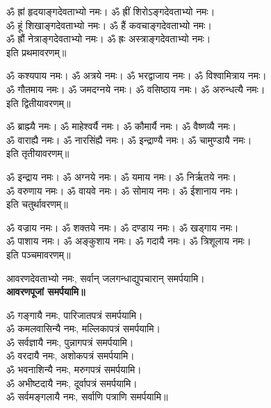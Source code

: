 
\begin{center}
ॐ ह्रां हृदयाङ्गदेवताभ्यो नमः। ॐ ह्रीं शिरोऽङ्गदेवताभ्यो नमः।\\
ॐ हूं शिखाङ्गदेवताभ्यो नमः। ॐ हैं कवचाङ्गदेवताभ्यो नमः।\\
ॐ ह्रौं नेत्राङ्गदेवताभ्यो नमः। ॐ ह्रः अस्त्राङ्गदेवताभ्यो नमः।\\
इति प्रथमावरणम्॥

ॐ कश्यपाय नमः। ॐ अत्रये नमः। ॐ भरद्वाजाय नमः। ॐ विश्वामित्राय नमः।\\
ॐ गौतमाय नमः। ॐ जमदग्नये नमः। ॐ वसिष्ठाय नमः। ॐ अरुन्धत्यै नमः।\\
इति द्वितीयावरणम्॥

ॐ ब्राह्म्यै नमः। ॐ माहेश्वर्यै नमः। ॐ कौमार्यै नमः। ॐ वैष्णव्यै नमः।\\
ॐ वाराह्यै नमः। ॐ नारसिंह्यै नमः। ॐ इन्द्राण्यै नमः। ॐ चामुण्डायै नमः।\\
इति तृतीयावरणम्॥

ॐ इन्द्राय नमः। ॐ अग्नये नमः। ॐ यमाय नमः। ॐ निर्ऋतये नमः।\\
ॐ वरुणाय नमः। ॐ वायवे नमः। ॐ सोमाय नमः। ॐ ईशानाय नमः।\\
इति चतुर्थावरणम्॥

ॐ वज्राय नमः। ॐ शक्तये नमः। ॐ दण्डाय नमः। ॐ खड्गाय नमः।\\
ॐ पाशाय नमः। ॐ अङ्कुशाय नमः। ॐ गदायै नमः। ॐ त्रिशूलाय नमः।\\
इति पञ्चमावरणम्॥

आवरणदेवताभ्यो नमः, सर्वान् जलगन्धाद्युपचारान् समर्पयामि।\\
\textbf{आवरणपूजां समर्पयामि॥}
\end{center}


\begin{center}
ॐ गङ्गायै नमः, पारिजातपत्रं समर्पयामि।\\
ॐ कमलवासिन्यै नमः, मल्लिकापत्रं समर्पयामि।\\
ॐ सर्वज्ञायै नमः, पुन्नागपत्रं समर्पयामि।\\
ॐ वरदायै नमः, अशोकपत्रं समर्पयामि।\\
ॐ भवनाशिन्यै नमः, मरुगपत्रं समर्पयामि।\\
ॐ अभीष्टदायै नमः, दूर्वापत्रं समर्पयामि।\\
ॐ सर्वमङ्गलायै नमः, सर्वाणि पत्राणि समर्पयामि॥
\end{center}

